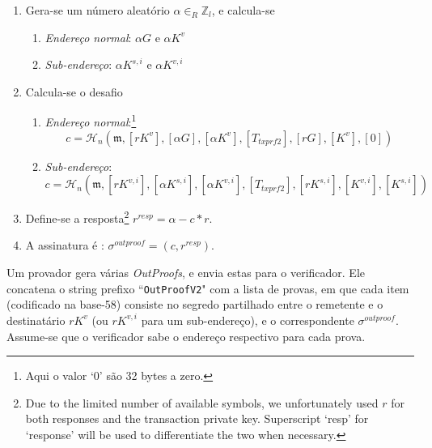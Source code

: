 
\begin{enumerate}
	\item Gera-se um número aleatório $\alpha \in_R \mathbb{Z}_l$, e calcula-se
	\begin{enumerate}
	    \item {\em Endereço normal}: $\alpha G$ e $\alpha K^v$
	    \item {\em Sub-endereço}: $\alpha K^{s,i}$ e $\alpha K^{v,i}$
	\end{enumerate}{}
	\item Calcula-se o desafio
	\begin{enumerate}
	    \item {\em Endereço normal}:\footnote{Aqui o valor `0' são 32 bytes a zero.}
	    \[c = \mathcal{H}_n(\mathfrak{m},[rK^v], [\alpha G], [\alpha K^v], [T_{txprf2}], [rG], [K^v], [0])\]
	    \item {\em Sub-endereço}:
	    \[c = \mathcal{H}_n(\mathfrak{m},[rK^{v,i}], [\alpha K^{s,i}], [\alpha K^{v,i}], [T_{txprf2}], [rK^{s,i}], [K^{v,i}], [K^{s,i}])\]
	\end{enumerate}{}
	\item Define-se a resposta\footnote{Due to the limited number of available symbols, we unfortunately used $r$ for both responses and the transaction private key. Superscript `resp' for `response' will be used to differentiate the two when necessary.} $r^{resp} = \alpha - c*r$.
	\item A assinatura é : $\sigma^{outproof} = (c, r^{resp})$.
\end{enumerate}{}

Um provador  gera várias {\em OutProofs}, e envia estas para o verificador. Ele concatena o string prefixo ``{\tt OutProofV2}" com a lista de provas, em que cada item (codificado na base-58) consiste no segredo partilhado entre o remetente e o destinatário $r K^v$ (ou $r K^{v,i}$ para um sub-endereço), e o correspondente $\sigma^{outproof}$. Assume-se que o verificador sabe o endereço respectivo para cada prova.


